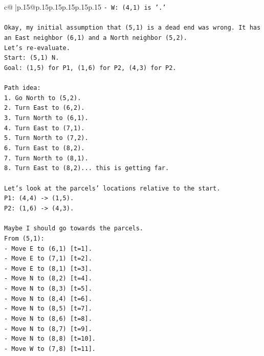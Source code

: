 \documentclass{article}
\begin{document}
{\begin{supertabular}{c@{$\;$}|p{.15\linewidth}@{}p{.15\linewidth}p{.15\linewidth}p{.15\linewidth}p{.15\linewidth}p{.15\linewidth}}
{{{\texttt{{-} W: (4,1) is '.'} \\
\\ 
\texttt{Okay, my initial assumption that (5,1) is a dead end was wrong. It has an East neighbor (6,1) and a North neighbor (5,2).} \\
\texttt{Let's re{-}evaluate.} \\
\texttt{Start: (5,1) N.} \\
\texttt{Goal: (1,5) for P1, (1,6) for P2, (4,3) for P2.} \\
\\ 
\texttt{Path idea:} \\
\texttt{1. Go North to (5,2).} \\
\texttt{2. Turn East to (6,2).} \\
\texttt{3. Turn North to (6,1).} \\
\texttt{4. Turn East to (7,1).} \\
\texttt{5. Turn North to (7,2).} \\
\texttt{6. Turn East to (8,2).} \\
\texttt{7. Turn North to (8,1).} \\
\texttt{8. Turn East to (8,2)... this is getting far.} \\
\\ 
\texttt{Let's look at the parcels' locations relative to the start.} \\
\texttt{P1: (4,4) {-}> (1,5).} \\
\texttt{P2: (1,6) {-}> (4,3).} \\
\\ 
\texttt{Maybe I should go towards the parcels.} \\
\texttt{From (5,1):} \\
\texttt{{-} Move E to (6,1) {[}t=1{]}.} \\
\texttt{{-} Move E to (7,1) {[}t=2{]}.} \\
\texttt{{-} Move E to (8,1) {[}t=3{]}.} \\
\texttt{{-} Move N to (8,2) {[}t=4{]}.} \\
\texttt{{-} Move N to (8,3) {[}t=5{]}.} \\
\texttt{{-} Move N to (8,4) {[}t=6{]}.} \\
\texttt{{-} Move N to (8,5) {[}t=7{]}.} \\
\texttt{{-} Move N to (8,6) {[}t=8{]}.} \\
\texttt{{-} Move N to (8,7) {[}t=9{]}.} \\
\texttt{{-} Move N to (8,8) {[}t=10{]}.} \\
\texttt{{-} Move W to (7,8) {[}t=11{]}.} \\
}}}
\end{supertabular}}
\end{document}
